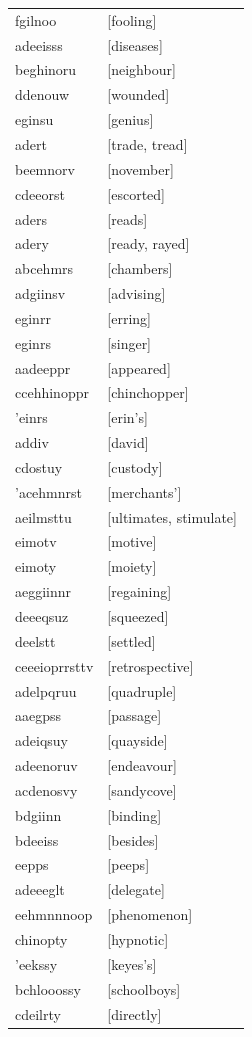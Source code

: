\documentclass{article}
\begin{document}
\begin{tabular}{ll}
fgilnoo & [fooling] \\
adeeisss & [diseases] \\
beghinoru & [neighbour] \\
ddenouw & [wounded] \\
eginsu & [genius] \\
adert & [trade, tread] \\
beemnorv & [november] \\
cdeeorst & [escorted] \\
aders & [reads] \\
adery & [ready, rayed] \\
abcehmrs & [chambers] \\
adgiinsv & [advising] \\
eginrr & [erring] \\
eginrs & [singer] \\
aadeeppr & [appeared] \\
ccehhinoppr & [chinchopper] \\
'einrs & [erin's] \\
addiv & [david] \\
cdostuy & [custody] \\
'acehmnrst & [merchants'] \\
aeilmsttu & [ultimates, stimulate] \\
eimotv & [motive] \\
eimoty & [moiety] \\
aeggiinnr & [regaining] \\
deeeqsuz & [squeezed] \\
deelstt & [settled] \\
ceeeioprrsttv & [retrospective] \\
adelpqruu & [quadruple] \\
aaegpss & [passage] \\
adeiqsuy & [quayside] \\
adeenoruv & [endeavour] \\
acdenosvy & [sandycove] \\
bdgiinn & [binding] \\
bdeeiss & [besides] \\
eepps & [peeps] \\
adeeeglt & [delegate] \\
eehmnnnoop & [phenomenon] \\
chinopty & [hypnotic] \\
'eekssy & [keyes's] \\
bchlooossy & [schoolboys] \\
cdeilrty & [directly] \\

\end{tabular}
\end{document}
